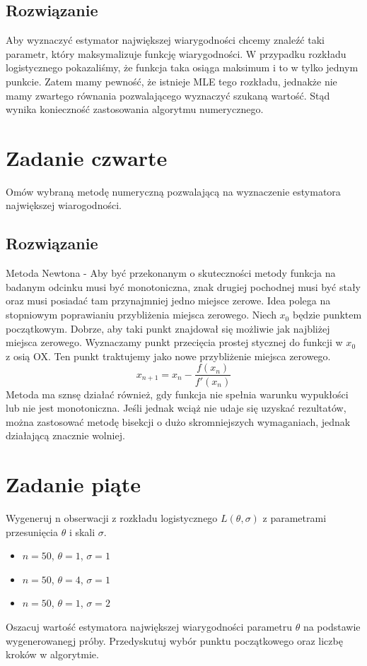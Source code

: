 \documentclass[a4paper]{article}
\begin{document}
\subsection{Rozwiązanie}
Aby wyznaczyć estymator największej wiarygodności chcemy znaleźć taki parametr, który maksymalizuje funkcję wiarygodności. W przypadku rozkładu logistycznego pokazaliśmy, że funkcja taka osiąga maksimum i to w tylko jednym punkcie. Zatem mamy pewność, że istnieje MLE tego rozkładu, jednakże nie mamy zwartego równania pozwalającego wyznaczyć szukaną wartość. Stąd wynika konieczność zastosowania algorytmu numerycznego.

\section{Zadanie czwarte}
Omów wybraną metodę numeryczną pozwalającą na wyznaczenie estymatora największej wiarogodności.

\subsection{Rozwiązanie}
Metoda Newtona - Aby być przekonanym o skuteczności metody funkcja na badanym odcinku  musi być monotoniczna, znak drugiej pochodnej musi być stały oraz musi posiadać tam przynajmniej jedno miejsce zerowe. Idea polega na stopniowym poprawianiu przybliżenia miejsca zerowego. Niech $x_0$ będzie punktem początkowym. Dobrze, aby taki punkt znajdował się możliwie jak najbliżej miejsca zerowego. Wyznaczamy punkt przecięcia prostej stycznej do funkcji w $x_0$ z osią OX. Ten punkt traktujemy jako nowe przybliżenie miejsca zerowego. $$x_{n+1}=x_n - \frac{f(x_n)}{f'(x_n)}$$
Metoda ma sznsę działać również, gdy funkcja nie spełnia warunku wypukłości lub nie jest monotoniczna. Jeśli jednak wciąż nie udaje się uzyskać rezultatów, można zastosować metodę bisekcji o dużo skromniejszych wymaganiach, jednak działającą znacznie wolniej.

\section{Zadanie piąte}
Wygeneruj n obserwacji z rozkładu logistycznego $L(\theta,\sigma)$ z parametrami przesunięcia $\theta$ i skali $\sigma$.
\begin{itemize}
\item $n=50$, $\theta=1$, $\sigma=1$
\item $n=50$, $\theta=4$, $\sigma=1$
\item $n=50$, $\theta=1$, $\sigma=2$
\end{itemize}
Oszacuj wartość estymatora największej wiarygodności parametru $\theta$ na podstawie wygenerowanegj próby. Przedyskutuj wybór punktu początkowego oraz liczbę kroków w algorytmie.\\
\end{document}
